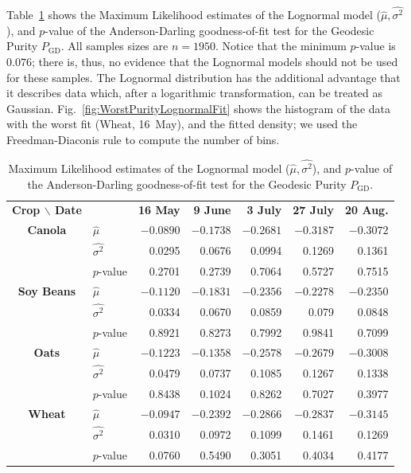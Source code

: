 \documentclass[journal]{IEEEtran}
\begin{document}
Table~\ref{tab:params_purity} shows the Maximum Likelihood estimates of the Lognormal model ($\widehat \mu,\widehat{\sigma^2}$), and $p$-value of the Anderson-Darling goodness-of-fit test for the Geodesic Purity $P_{\text{GD}}$.
All samples sizes are $n=1950$.
Notice that the minimum $p$-value is $0.076$; there is, thus, no evidence that the Lognormal models should not be used for these samples.
The Lognormal distribution has the additional advantage that it describes data which, after a logarithmic transformation, can be treated as Gaussian.
Fig.~\ref{fig:WorstPurityLognormalFit} shows the histogram of the data with the worst fit (Wheat, 16~May), and the fitted density; we used the Freedman-Diaconis rule to compute the number of bins.

\begin{table}[hbt]
	\centering
	\caption{Maximum Likelihood estimates of the Lognormal model ($\widehat \mu,\widehat{\sigma^2}$), and $p$-value of the Anderson-Darling goodness-of-fit test for the Geodesic Purity $P_{\text{GD}}$.}
	\label{tab:params_purity}
	\setlength{\tabcolsep}{2pt}
	\begin{tabular}{clrrrrr}
		\toprule
		\textbf{Crop $\backslash$ Date} & & \textbf{16 May} & \textbf{9 June} & \textbf{3 July} & \textbf{27 July} & \textbf{20 Aug.}\\ \cmidrule(lr){1-2} \cmidrule(lr){3-3} \cmidrule(lr){4-4} \cmidrule(lr){5-5} \cmidrule(lr){6-6} \cmidrule(lr){7-7}
		\textbf{Canola} 	
		& $\widehat{\mu}$ 		& $-0.0890$  & $-0.1738$   & $-0.2681$   & $-0.3187$   & $-0.3072$ \\
		& $\widehat{\sigma^2}$ 	& 0.0295 	& 0.0676 	& 0.0994 	& 0.1269  	& 0.1361 \\ 
		& $p$-value 			& 0.2701	& 0.2739 	& 0.7064 	& 0.5727 	& 0.7515\\		
		\midrule
		\textbf{Soy Beans}
		& $\widehat{\mu}$ 		& $-0.1120$	& $-0.1831$	& $-0.2356$ & $-0.2278$ & $-0.2350$         \\
		& $\widehat{\sigma^2}$ 	& 0.0334   	& 0.0670   	& 0.0859   	& 0.079   	& 0.0848 \\ 
		& $p$-value 			& 0.8921 	& 0.8273 	& 0.7992 	& 0.9841 	& 0.7099\\			
		\midrule
		\textbf{Oats}
		& $\widehat{\mu}$ 		& $-0.1223$ & $-0.1358$	& $-0.2578$ & $-0.2679$	& $-0.3008$ \\
		& $\widehat{\sigma^2}$ 	& 0.0479 	& 0.0737   	& 0.1085 	& 0.1267  	& 0.1338 \\ 
		& $p$-value 			& 0.8438 	& 0.1024 	& 0.8262 	& 0.7027	& 0.3977 \\
		\midrule
		\textbf{Wheat} 
		& $\widehat{\mu}$ 		& $-0.0947$	& $-0.2392$ & $-0.2866$ & $-0.2837$ & $-0.3145$ \\
		& $\widehat{\sigma^2}$ 	& 0.0310   	& 0.0972   	& 0.1099   	& 0.1461   	& 0.1269   \\
		& $p$-value 			& 0.0760 	& 0.5490 	& 0.3051 	& 0.4034 	& 0.4177\\	
		\bottomrule
	\end{tabular}
\end{table}
\end{document}
